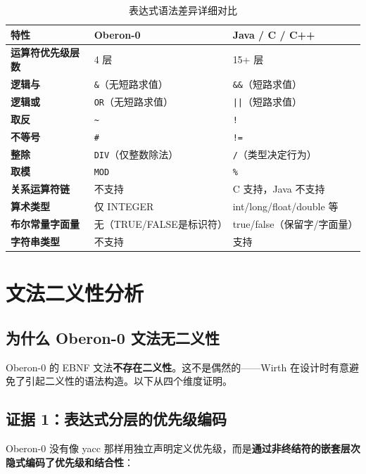 \documentclass[12pt,a4paper,fontset=none]{ctexart}
\begin{document}
\begin{table}[H]\centering
\begin{tabularx}{\textwidth}{>{\bfseries}P{3cm}YY}
\toprule
特性 & Oberon-0 & Java / C / C++ \\
\midrule
运算符优先级层数 & 4 层 & 15+ 层 \\
逻辑与 & \texttt{\&}（无短路求值） & \texttt{\&\&}（短路求值） \\
逻辑或 & \texttt{OR}（无短路求值） & \texttt{||}（短路求值） \\
取反 & \texttt{\~{}} & \texttt{!} \\
不等号 & \texttt{\#} & \texttt{!=} \\
整除 & \texttt{DIV}（仅整数除法） & \texttt{/}（类型决定行为） \\
取模 & \texttt{MOD} & \texttt{\%} \\
关系运算符链 & 不支持 & C 支持，Java 不支持 \\
算术类型 & 仅 INTEGER & int/long/float/double 等 \\
布尔常量字面量 & 无（TRUE/FALSE是标识符） & true/false（保留字/字面量） \\
字符串类型 & 不支持 & 支持 \\
\bottomrule
\end{tabularx}
\caption{表达式语法差异详细对比}
\end{table}

\section{文法二义性分析}

\subsection{为什么 Oberon-0 文法无二义性}

Oberon-0 的 EBNF 文法\textbf{不存在二义性}。这不是偶然的——Wirth 在设计时有意避免了引起二义性的语法构造。以下从四个维度证明。

\subsection*{证据 1：表达式分层的优先级编码}

Oberon-0 没有像 yacc 那样用独立声明定义优先级，而是\textbf{通过非终结符的嵌套层次隐式编码了优先级和结合性}：
\end{document}
